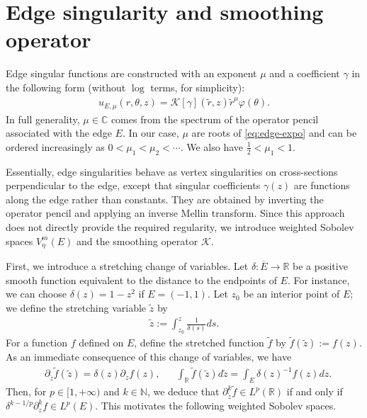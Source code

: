 ﻿\documentclass[11pt,reqno,oneside]{amsart}
\theoremstyle{definition}
\theoremstyle{remark}
\newcommand{\R}{\mathbb{R}}
\newcommand{\C}{\mathbb{C}}
\newcommand{\N}{\mathbb{N}}
\renewcommand{\d}{\delta}
\newcommand{\g}{\gamma}
\newcommand{\vf}{\varphi}
\renewcommand{\t}{\theta}
\newcommand{\p}{\partial}
\begin{document}
        \section{Edge singularity and smoothing operator}\label{explain:edge}
        Edge singular functions are constructed with an exponent $\mu$ and a coefficient $\g$ in the following form (without $\log$ terms, for simplicity):
        \begin{align}\label{eq:edge-singular}
            u_{E,\mu}(r,\t,z)= \mathcal{K}[\g](\widetilde{r},z)\widetilde{r}^\mu\vf(\t).
        \end{align}
        In full generality, $\mu\in\C$ comes from the spectrum of the operator pencil associated with the edge $E$. In our case, $\mu$ are roots of \eqref{eq:edge-expo} and can be ordered increasingly as $0<\mu_1<\mu_2<\cdots$. We also have $\frac{1}{2}<\mu_1<1$.

        Essentially, edge singularities behave as vertex singularities on cross-sections perpendicular to the edge, except that singular coefficients $\g(z)$ are functions along the edge rather than constants. They are obtained by inverting the operator pencil and applying an inverse Mellin transform. Since this approach does not directly provide the required regularity, we introduce weighted Sobolev spaces $V_{\eta}^m(E)$ and the smoothing operator $\mathcal{K}$.

        First, we introduce a stretching change of variables. Let $\d:\overline{E}\rightarrow \R$ be a positive smooth function equivalent to the distance to the endpoints of $E$. For instance, we can choose $\d(z)=1-z^2$ if $E=(-1,1)$. Let $z_0$ be an interior point of $E$; we define the stretching variable $\widetilde{z}$ by
        \begin{align*} 
            \widetilde{z}:=\int_{z_0}^z \frac{1}{\d(s)}ds.
        \end{align*}
        For a function $f$ defined on $E$, define the stretched function $\widetilde{f}$ by $\widetilde{f}(\widetilde{z}):=f(z)$. As an immediate consequence of this change of variables, we have
        \begin{align*}
            &\p_{\widetilde{z}} \widetilde{f}(\widetilde{z})=\d(z)\p_z f(z), &      &\int_\R \widetilde{f}(\widetilde{z})d\widetilde{z}=\int_E \d(z)^{-1}f(z) dz.
        \end{align*}
        Then, for $p\in [1,+\infty)$ and $k\in\N$, we deduce that $\p^k_{\widetilde{z}}\widetilde{f}\in L^p(\R)$ if and only if $\d^{k-1/p}\p_z^k f\in L^p(E)$. This motivates the following weighted Sobolev spaces.
        
\end{document}
